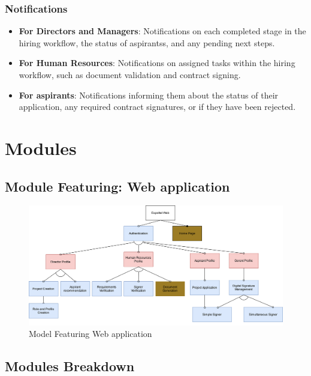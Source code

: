 \documentclass{scrreprt}
\begin{document}
\subsection*{Notifications}
\begin{itemize}
    \item \textbf{For Directors and Managers}: Notifications on each completed stage in the hiring workflow, the status of aspirantss, and any pending next steps.
    \item \textbf{For Human Resources}: Notifications on assigned tasks within the hiring workflow, such as document validation and contract signing.
    \item \textbf{For aspirants}: Notifications informing them about the status of their application, any required contract signatures, or if they have been rejected.
\end{itemize}


\chapter{Modules}

\section{Module Featuring: Web application}

\begin{figure} 
    
    \centering \small
    \includegraphics[width=1\textwidth]{ModuleFeaturingWeb.png}
    \caption{Model Featuring Web application}
\end{figure}
\FloatBarrier 
\section{Modules Breakdown}

\setcounter{secnumdepth}{3}
\renewcommand\thesubsubsection{\thesection.\arabic{subsubsection}}
\end{document}
